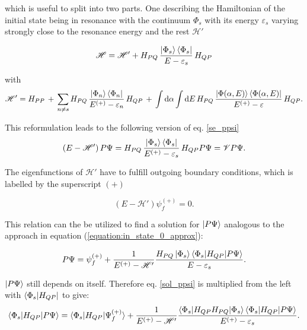 which is useful to split into two parts. One describing the Hamiltonian of the
initial state being in resonance with the continuum $\Phi_s$ with its energy
$\varepsilon_s$ varying strongly close to the resonance energy and the rest
$\mathscr{H}'$

\begin{equation}
  \mathscr{H} = \mathscr{H}' + H_{PQ} \,\frac{\ket{\Phi_s}\bra{\Phi_s}}{E-\varepsilon_s}\, H_{QP}
\end{equation}

with
\begin{equation}
  \mathscr{H}' = H_{PP}\, + \,
  \sum\limits_{n\ne s} H_{PQ} \,\frac{\ket{\Phi_n}\bra{\Phi_n}}{E^{(+)}-\varepsilon_n}
  \, H_{QP} \,+\,
  \int \mathrm{d}\alpha \int\mathrm{d}E \,H_{PQ} \,
  \frac{\ket{\Phi(\alpha,E)}\bra{\Phi(\alpha,E)}}{E^{(+)}-\varepsilon} \, H_{QP} .
\end{equation}

This reformulation leads to the following version of eq. \ref{se_ppsi}
\begin{equation}
  (E - \mathscr{H}')\, P \Psi =
   H_{PQ} \,\frac{\ket{\Phi_s}\bra{\Phi_s}}{E^{(+)}-\varepsilon_s}\, H_{QP} P \Psi = \mathscr{V} P \Psi.
\end{equation}

The eigenfunctions of $\mathscr{H}'$ have to fulfill outgoing boundary conditions,
which is labelled by the superscript $(+)$

\begin{equation}
  (E-\mathscr{H}') \psi_f^{(+)} = 0 \label{sol_outg} .
\end{equation}

This relation can the be utilized to find a solution for $\ket{P \Psi}$ analogous
to the approach in equation (\ref{equation:in_state_0_approx}):

\begin{equation}\label{sol_ppsi}
  P \Psi = \psi_f^{(+)} + \frac{1}{E^{(+)} - \mathscr{H}'}
           \frac{H_{PQ}\ket{\Phi_s}
           \braket{\Phi_s|H_{QP}|P\Psi}}{E - \varepsilon_s} .
\end{equation}

$\ket{P \Psi}$ still depends on itself. Therefore 
eq. \ref{sol_ppsi}
is multiplied from the left with $\bra{\Phi_s|H_{QP}}$ to give:
\begin{equation}
  \braket{\Phi_s|H_{QP}|P\Psi} = \braket{\Phi_s|H_{QP}|\Psi_f^{(+)}} +
  \frac{1}{E^{(+)} - \mathscr{H}'}
  \frac{\braket{\Phi_s|H_{QP}H_{PQ}|\Phi_s} \braket{\Phi_s|H_{QP}|P\Psi}}
       {E^{(+)} - \varepsilon_s}  \label{s_ppsi} .
\end {equation}

